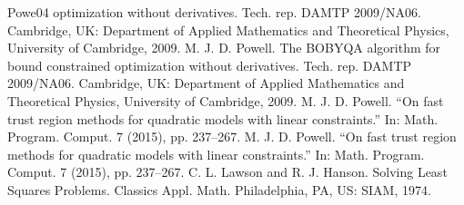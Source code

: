 \documentclass[letterpaper,10pt,english]{sphinxmanual}
\begin{document}
\begin{sphinxthebibliography}{Powe04}
optimization without derivatives. Tech. rep. DAMTP 2009/NA06. Cambridge,
UK: Department of Applied Mathematics and Theoretical Physics, University
of Cambridge, 2009.
\sphinxAtStartPar
M. J. D. Powell. The BOBYQA algorithm for bound constrained
optimization without derivatives. Tech. rep. DAMTP 2009/NA06. Cambridge,
UK: Department of Applied Mathematics and Theoretical Physics, University
of Cambridge, 2009.
\sphinxAtStartPar
M. J. D. Powell. “On fast trust region methods for quadratic
models with linear constraints.” In: Math. Program. Comput. 7 (2015), pp.
237–\sphinxhyphen{}267.
\sphinxAtStartPar
M. J. D. Powell. “On fast trust region methods for quadratic
models with linear constraints.” In: Math. Program. Comput. 7 (2015), pp.
237–267.
\sphinxAtStartPar
C. L. Lawson and R. J. Hanson. Solving Least Squares Problems.
Classics Appl. Math. Philadelphia, PA, US: SIAM, 1974.
\end{sphinxthebibliography}


\renewcommand{\indexname}{Python Module Index}
\begin{sphinxtheindex}
\let\bigletter\sphinxstyleindexlettergroup
\bigletter{c}
\item\relax{}
\item\relax{}
\item\relax{}
\end{sphinxtheindex}

\renewcommand{\indexname}{Index}
\printindex
\end{document}
